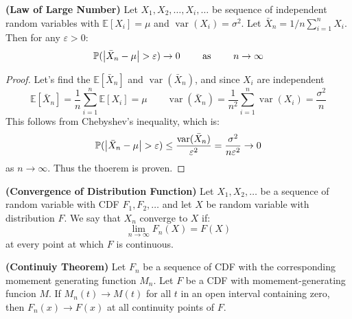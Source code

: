 \begin{theorem}{\textbf{(Law of Large Number)}}
    Let $X_1,X_2,\dots,X_i,\dots$ be sequence of independent random variables with $\mathbb{E}[X_i] = \mu$ and $\operatorname{var}(X_i) = \sigma^2$. Let $\bar{X}_n = 1/n\sum^n_{i=1}X_i$. Then for any $\varepsilon>0$:
    \begin{equation*}
        \mathbb{P}(\left| \bar{X}_n - \mu \right| > \varepsilon) \rightarrow 0 \qquad \text{ as } \qquad n\rightarrow \infty
    \end{equation*}
\end{theorem}
\begin{proof}
    Let's find the $\mathbb{E}[\bar{X}_n]$ and $\operatorname{var}(\bar{X}_n)$, and since $X_i$ are independent
    \begin{equation*}
        \mathbb{E}[\bar{X}_n] = \frac{1}{n}\sum^n_{i=1}\mathbb{E}[X_i] = \mu
        \qquad \operatorname{var}(\bar{X}_n) = \frac{1}{n^2}\sum^n_{i=1}\operatorname{var}(X_i) = \frac{\sigma^2}{n}
    \end{equation*}
    This follows from Chebyshev's inequality, which is:
    \begin{equation*}
        \mathbb{P}(\abs{\bar{X}_n - \mu}>\varepsilon)\le\frac{\operatorname{var}(\bar{X}_n)}{\varepsilon^2} = \frac{\sigma^2}{n\varepsilon^2} \rightarrow 0
    \end{equation*}
    as $n\rightarrow \infty$. Thus the thoerem is proven.
\end{proof}

\begin{definition}{\textbf{(Convergence of Distribution Function)}}
    Let $X_1,X_2,\dots$ be a sequence of random variable with CDF $F_1, F_2,\dots$ and let $X$ be random variable with distribution $F$. We say that $X_n$ converge to $X$ if:
    \begin{equation*}
        \lim_{n\rightarrow\infty} F_n(X) = F(X)
    \end{equation*}
    at every point at which $F$ is continuous.
\end{definition}

\begin{theorem}{\textbf{(Continuiy Theorem)}}
    Let $F_n$ be a sequence of CDF with the corresponding momement generating function $M_n$. Let $F$ be a CDF with momement-generating funcion $M$. If $M_n(t) \rightarrow M(t)$ for all $t$ in an open interval containing zero, then $F_n(x)\rightarrow F(x)$ at all continuity points of $F$. 
\end{theorem}

